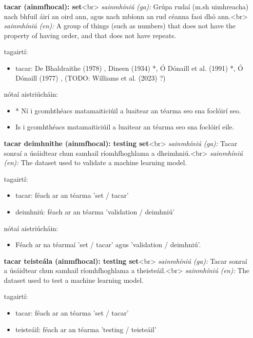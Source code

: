 \documentclass{article}
\begin{document}
\textbf{tacar (ainmfhocal): set}<br>
\textit{sainmhíniú (ga):} Grúpa rudaí (m.sh uimhreacha) nach bhfuil áirí an oird ann, agus nach mbíonn an rud céanna faoi dhó ann.<br>
\textit{sainmhíniú (en):} A group of things (such as numbers) that does not have the property of having order, and that does not have repeats.

tagairtí:
\begin{itemize}
	\item tacar: De Bhaldraithe (1978) \cite{de-bhaldraithe}, Dineen (1934) \cite{dineen}*, Ó Dónaill et al. (1991) \cite{focloir-beag}*, Ó Dónaill (1977) \cite{odonaill}, (TODO: Williams et al. (2023) \cite{storchiste}?)
\end{itemize}

nótaí aistriúcháin:
\begin{itemize}
	\item * Ní i gcomhthéacs matamaiticiúil a luaitear an téarma seo sna foclóirí seo.
	\item Is i gcomhthéacs matamaiticiúil a luaitear an téarma seo sna foclóirí eile.
\end{itemize}


\textbf{tacar deimhnithe (ainmfhocal): testing set}<br>
\textit{sainmhíniú (ga):} Tacar sonraí a úsáidtear chun samhail ríomhfhoghlama a dheimhniú.<br>
\textit{sainmhíniú (en):} The dataset used to validate a machine learning model.

tagairtí:
\begin{itemize}
	\item tacar: féach ar an téarma 'set / tacar'
	\item deimhniú: féach ar an téarma 'validation / deimhniú'
\end{itemize}

nótaí aistriúcháin:
\begin{itemize}
	\item Féach ar na téarmaí 'set / tacar' agus 'validation / deimhniú'.
\end{itemize}


\textbf{tacar teisteála (ainmfhocal): testing set}<br>
\textit{sainmhíniú (ga):} Tacar sonraí a úsáidtear chun samhail ríomhfhoghlama a theisteáil.<br>
\textit{sainmhíniú (en):} The dataset used to test a machine learning model.

tagairtí:
\begin{itemize}
	\item tacar: féach ar an téarma 'set / tacar'
	\item teisteáil: féach ar an téarma 'testing / teisteáil'
\end{itemize}
\end{document}
